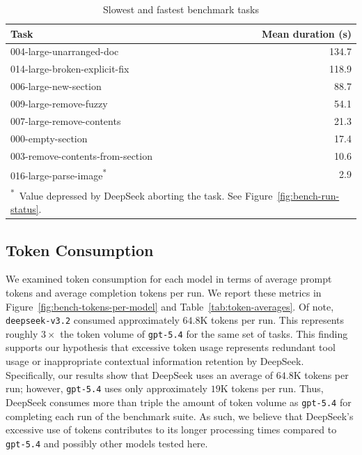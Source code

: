 \begin{table}[htb]
    \centering
    \caption{Slowest and fastest benchmark tasks}
    \label{tab:hardest-tasks}
    \begin{tabular}{lr}
        \hline
        \textbf{Task} & \textbf{Mean duration (s)} \\
        \hline
        004-large-unarranged-doc & 134.7 \\
        014-large-broken-explicit-fix & 118.9 \\
        006-large-new-section & 88.7 \\
        009-large-remove-fuzzy & 54.1 \\
        \hline
        007-large-remove-contents & 21.3 \\
        000-empty-section & 17.4 \\
        003-remove-contents-from-section & 10.6 \\
        016-large-parse-image\textsuperscript{*} & 2.9 \\
        \hline
        \multicolumn{2}{l}{\footnotesize\textsuperscript{*}~Value depressed by DeepSeek aborting the task. See Figure~\ref{fig:bench-run-status}.}
    \end{tabular}
\end{table}

\subsection{Token Consumption}
We examined token consumption for each model in terms of average prompt tokens and average completion tokens per run.
We report these metrics in Figure~\ref{fig:bench-tokens-per-model} and Table~\ref{tab:token-averages}.
Of note, \texttt{deepseek-v3.2} consumed approximately $64.8$K tokens per run.
This represents roughly $3\times$ the token volume of \texttt{gpt-5.4} for the same set of tasks.
This finding supports our hypothesis that excessive token usage represents redundant tool usage or inappropriate contextual information retention by DeepSeek.
Specifically, our results show that DeepSeek uses an average of $64.8$K tokens per run; however, \texttt{gpt-5.4} uses only approximately $19$K tokens per run.
Thus, DeepSeek consumes more than triple the amount of token volume as \texttt{gpt-5.4} for completing each run of the benchmark suite.
As such, we believe that DeepSeek's excessive use of tokens contributes to its longer processing times compared to \texttt{gpt-5.4} and possibly other models tested here.

